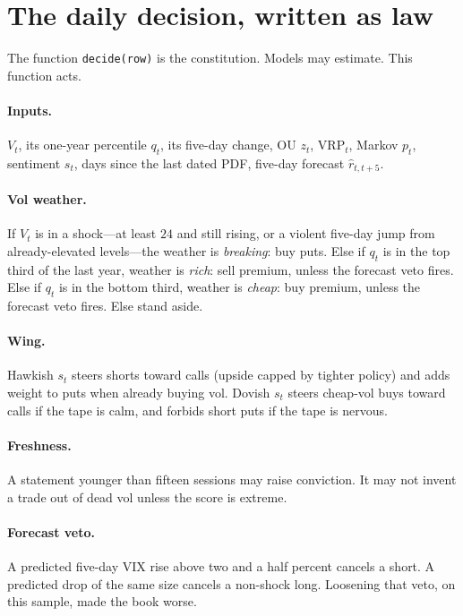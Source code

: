 \documentclass[11pt,a4paper]{article}
\begin{document}
\section{The daily decision, written as law}
\label{ch:law}

The function \texttt{decide(row)} is the constitution. Models may estimate. This function acts.

\paragraph{Inputs.} $V_t$, its one-year percentile $q_t$, its five-day change, OU $z_t$, $\mathrm{VRP}_t$, Markov $p_t$, sentiment $s_t$, days since the last dated PDF, five-day forecast $\hat r_{t,t+5}$.

\paragraph{Vol weather.}
If $V_t$ is in a shock---at least $24$ and still rising, or a violent five-day jump from already-elevated levels---the weather is \emph{breaking}: buy puts.
Else if $q_t$ is in the top third of the last year, weather is \emph{rich}: sell premium, unless the forecast veto fires.
Else if $q_t$ is in the bottom third, weather is \emph{cheap}: buy premium, unless the forecast veto fires.
Else stand aside.

\paragraph{Wing.}
Hawkish $s_t$ steers shorts toward calls (upside capped by tighter policy) and adds weight to puts when already buying vol.
Dovish $s_t$ steers cheap-vol buys toward calls if the tape is calm, and forbids short puts if the tape is nervous.

\paragraph{Freshness.}
A statement younger than fifteen sessions may raise conviction. It may not invent a trade out of dead vol unless the score is extreme.

\paragraph{Forecast veto.}
A predicted five-day VIX rise above two and a half percent cancels a short. A predicted drop of the same size cancels a non-shock long. Loosening that veto, on this sample, made the book worse.
\end{document}
